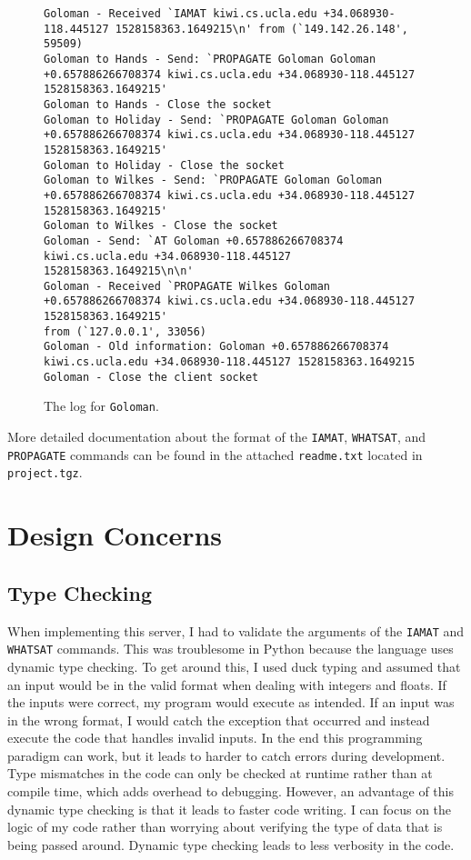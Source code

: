 \documentclass[letterpaper,twocolumn,10pt]{article}
\begin{document}
\begin{figure*}[!ht]
{\scriptsize
\begin{verbatim}
Goloman - Received `IAMAT kiwi.cs.ucla.edu +34.068930-118.445127 1528158363.1649215\n' from (`149.142.26.148', 59509)
Goloman to Hands - Send: `PROPAGATE Goloman Goloman +0.657886266708374 kiwi.cs.ucla.edu +34.068930-118.445127
1528158363.1649215'
Goloman to Hands - Close the socket
Goloman to Holiday - Send: `PROPAGATE Goloman Goloman +0.657886266708374 kiwi.cs.ucla.edu +34.068930-118.445127
1528158363.1649215'
Goloman to Holiday - Close the socket
Goloman to Wilkes - Send: `PROPAGATE Goloman Goloman +0.657886266708374 kiwi.cs.ucla.edu +34.068930-118.445127
1528158363.1649215'
Goloman to Wilkes - Close the socket
Goloman - Send: `AT Goloman +0.657886266708374 kiwi.cs.ucla.edu +34.068930-118.445127 1528158363.1649215\n\n'
Goloman - Received `PROPAGATE Wilkes Goloman +0.657886266708374 kiwi.cs.ucla.edu +34.068930-118.445127 1528158363.1649215'
from (`127.0.0.1', 33056)
Goloman - Old information: Goloman +0.657886266708374 kiwi.cs.ucla.edu +34.068930-118.445127 1528158363.1649215
Goloman - Close the client socket
\end{verbatim}
}
\caption{The log for \texttt{Goloman}.}
\label{goloman}
\end{figure*}

More detailed documentation about the format of the \texttt{IAMAT}, \texttt{WHATSAT}, and \texttt{PROPAGATE} commands can be found in the
attached \texttt{readme.txt} located in \texttt{project.tgz}.

\section{Design Concerns}

\subsection{Type Checking}

When implementing this server, I had to validate the arguments of the \texttt{IAMAT} and \texttt{WHATSAT} commands. This was
troublesome in Python because the language uses dynamic type checking. To get around this, I used duck typing and assumed that
an input would be in the valid format when dealing with integers and floats. If the inputs were correct, my program would execute
as intended. If an input was in the wrong format, I would catch the exception that occurred and instead execute the code that handles
invalid inputs. In the end this programming paradigm can work, but it leads to harder to catch errors during development. Type mismatches
in the code can only be checked at runtime rather than at compile time, which adds overhead to debugging. However, an advantage of
this dynamic type checking is that it leads to faster code writing. I can focus on the logic of my code rather than worrying about
verifying the type of data that is being passed around. Dynamic type checking leads to less verbosity in the code.
\end{document}
